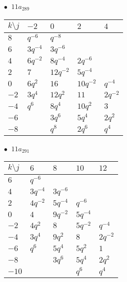 \begin{minipage}{\linewidth}
$\bullet\ $ $11a_{289}$ \vspace{0.5em} \\
\begin{tabular}{l|llll}
$k \setminus j$ & $-2$ & $0$ & $2$ & $4$ \\
\hline
$8$ & $q^{-6}$ & $q^{-8}$ &  &  \\
$6$ & $3q^{-4}$ & $3q^{-6}$ &  &  \\
$4$ & $6q^{-2}$ & $8q^{-4}$ & $2q^{-6}$ &  \\
$2$ & $7$ & $12q^{-2}$ & $5q^{-4}$ &  \\
$0$ & $6q^{2}$ & $16$ & $10q^{-2}$ & $q^{-4}$ \\
$-2$ & $3q^{4}$ & $12q^{2}$ & $11$ & $2q^{-2}$ \\
$-4$ & $q^{6}$ & $8q^{4}$ & $10q^{2}$ & $3$ \\
$-6$ &  & $3q^{6}$ & $5q^{4}$ & $2q^{2}$ \\
$-8$ &  & $q^{8}$ & $2q^{6}$ & $q^{4}$ \\
\end{tabular}
\vspace{2em}
\end{minipage}
%
\begin{minipage}{\linewidth}
$\bullet\ $ $11a_{291}$ \vspace{0.5em} \\
\begin{tabular}{l|llll}
$k \setminus j$ & $6$ & $8$ & $10$ & $12$ \\
\hline
$6$ & $q^{-6}$ &  &  &  \\
$4$ & $3q^{-4}$ & $3q^{-6}$ &  &  \\
$2$ & $4q^{-2}$ & $5q^{-4}$ & $q^{-6}$ &  \\
$0$ & $4$ & $9q^{-2}$ & $5q^{-4}$ &  \\
$-2$ & $4q^{2}$ & $8$ & $5q^{-2}$ & $q^{-4}$ \\
$-4$ & $3q^{4}$ & $9q^{2}$ & $8$ & $2q^{-2}$ \\
$-6$ & $q^{6}$ & $5q^{4}$ & $5q^{2}$ & $1$ \\
$-8$ &  & $3q^{6}$ & $5q^{4}$ & $2q^{2}$ \\
$-10$ &  &  & $q^{6}$ & $q^{4}$ \\
\end{tabular}
\vspace{2em}
\end{minipage}
%
